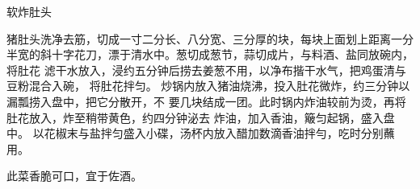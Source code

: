 \begin{recipe}{软炸肚头}

\ingredients


\cooking

\step 猪肚头洗净去筋，切成一寸二分长、八分宽、三分厚的块，每块上面划上距离一分
半宽的斜十字花刀，漂于清水中。葱切成葱节，蒜切成片，与料酒、盐同放碗内，将肚花
滤干水放入，浸约五分钟后捞去姜葱不用，以净布揩干水气，把鸡蛋清与豆粉混合入碗，
将肚花拌匀。
\step 炒锅内放入猪油烧沸，投入肚花微炸，约三分钟以漏瓢捞入盘中，把它分散开，不
要几块结成一团。此时锅内炸油较前为烫，再将肚花放入，炸至稍带黄色，约四分钟泌去
炸油，加入香油，簸匀起锅，盛入盘中。
\step 以花椒末与盐拌匀盛入小碟，汤杯内放入醋加数滴香油拌勻，吃时分别蘸用。

\notes

此菜香脆可口，宜于佐酒。

\end{recipe}


